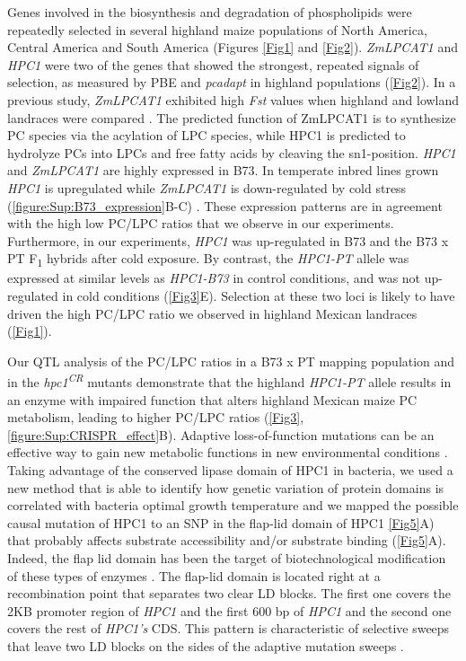 \documentclass[9pt,twocolumn,twoside,lineno]{biorxiv}
\newcommand{\hpc}{\textit{HPC1}\xspace}
\begin{document}
Genes involved in the biosynthesis and degradation of phospholipids were repeatedly selected in several highland maize populations of North America, Central America and South America (Figures \cref{Fig1} and \cref{Fig2}). 
\textit{ZmLPCAT1} and \hpc were two of the genes that showed the strongest, repeated signals of selection, as measured by PBE and \textit{pcadapt} in highland populations (\cref{Fig2}). 
In a previous study, \textit{ZmLPCAT1} exhibited high \textit{Fst} values when highland and lowland landraces were compared \cite{Takuno2015-uj}.
The predicted function of ZmLPCAT1 is to synthesize PC species via the acylation of LPC species, while HPC1 is predicted to hydrolyze PCs into LPCs and free fatty acids by cleaving the sn1-position.
\hpc and \textit{ZmLPCAT1} are highly expressed in B73. 
In temperate inbred lines grown \hpc is upregulated while \textit{ZmLPCAT1} is down-regulated by cold stress (\cref{figure:Sup:B73_expression}B-C) \cite{Waters2017-nat}.
These expression patterns are in agreement with the high low PC/LPC ratios that we observe in our experiments. 
Furthermore, in our experiments, \hpc was up-regulated in B73 and the B73 x PT F\textsubscript{1} hybrids after cold exposure. 
By contrast, the \textit{HPC1-PT} allele was expressed at similar levels as \textit{HPC1-B73} in control conditions, and was not up-regulated in cold conditions (\cref{Fig3}E).
Selection at these two loci is likely to have driven the high PC/LPC ratio we observed in highland Mexican landraces (\cref{Fig1}). 

Our QTL analysis of the PC/LPC ratios in a B73 x PT mapping population and in the \textit{hpc1\textsuperscript{CR}} mutants demonstrate that the highland \textit{HPC1-PT} allele results in an enzyme with impaired function that alters highland Mexican maize PC metabolism, leading to higher PC/LPC ratios (\cref{Fig3}, \cref{figure:Sup:CRISPR_effect}B). 
Adaptive loss-of-function mutations can be an effective way to gain new metabolic functions in new environmental conditions \cite{Hottes2013-np}.
Taking advantage of the conserved lipase domain of HPC1 in bacteria, we used a new method that is able to identify how genetic variation of protein domains is correlated with bacteria optimal growth temperature \cite{Jensen2021-iv, Jensen2021-zm} and we mapped the possible causal mutation of HPC1 to an SNP in the flap-lid domain of HPC1 \cref{Fig5}A) that probably affects substrate  accessibility and/or substrate binding (\cref{Fig5}A). 
Indeed, the flap lid domain has been the target of biotechnological modification of these types of enzymes \cite{Khan2017-ua}.
The flap-lid domain is located right at a recombination point that separates two clear LD blocks. 
The first one covers the 2KB promoter region of \hpc and the first 600 bp of \hpc and the second one covers the rest of \textit{HPC1's} CDS.
This pattern is characteristic of selective sweeps that leave two LD blocks on the sides of the adaptive mutation sweeps \cite{Kim2004-pa}. 
\end{document}
